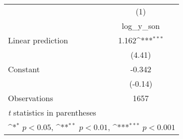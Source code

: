 {
\def\sym#1{\ifmmode^{#1}\else\(^{#1}\)\fi}
\begin{tabular}{l*{1}{c}}
\hline\hline
                    &\multicolumn{1}{c}{(1)}\\
                    &\multicolumn{1}{c}{log\_y\_son}\\
\hline
Linear prediction   &       1.162\sym{***}\\
                    &      (4.41)         \\
[1em]
Constant            &      -0.342         \\
                    &     (-0.14)         \\
\hline
Observations        &        1657         \\
\hline\hline
\multicolumn{2}{l}{\footnotesize \textit{t} statistics in parentheses}\\
\multicolumn{2}{l}{\footnotesize \sym{*} \(p<0.05\), \sym{**} \(p<0.01\), \sym{***} \(p<0.001\)}\\
\end{tabular}
}
